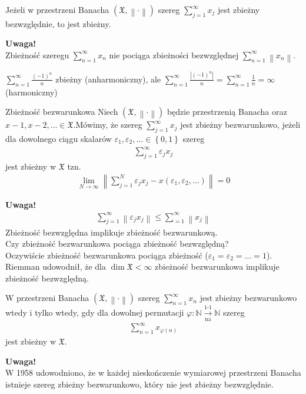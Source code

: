 \begin{twr}
Jeżeli w przestrzeni Banacha $ \left(\mathfrak X,\left\|\cdot \right\|\right) $ szereg $ \sum_{j=1}^{\infty }x_j  $ jest zbieżny bezwzględnie, to jest zbieżny.
\end{twr}
\textbf{Uwaga!}\\
Zbieżność szeregu $ \sum_{n=1}^{\infty }x_n $  nie pociąga zbieżności bezwzględnej $ \sum_{n=1}^{\infty }\left\|x_n\right\| $.
\begin{prz}
$ \sum_{n=1}^{\infty }\frac{(-1)^n}{n} $ zbieżny (anharmoniczny), ale $ \sum_{n=1}^{\infty }\frac{\left|(-1)^n\right|}{n}=\sum_{n=1}^{\infty }\frac{1}{n}=\infty  $ (harmoniczny)
\end{prz}
\begin{defi}{Zbieżność bezwarunkowa}
Niech $ \left(\mathfrak X,\left\|\cdot \right\|\right) $ będzie przestrzenią Banacha oraz $ x-1,x-2,\dots \in\mathfrak X $.Mówimy, że szereg $ \sum_{j=1}^{\infty }x_j $ jest zbieżny bezwarunkowo, jeżeli dla dowolnego ciągu skalarów $ \varepsilon_1,\varepsilon_2,\dots\in\left\{0,1 \right\} $ szereg
\begin{gather*}
\sum_{j=1}^{\infty }\varepsilon_jx_j
\end{gather*}
jest zbieżny w $ \mathfrak X $ tzn.
\begin{gather*}
\lim\limits_{N\to\infty}\left\|\sum_{j=1}^{N}\varepsilon_jx_j-x(\varepsilon_1,\varepsilon_2,\dots )\right\| =0
\end{gather*}
\end{defi}
\textbf{Uwaga!}\\
\begin{gather*}
\sum_{j=1}^{\infty }\left\|\varepsilon_jx_j \right\| \le\sum_{=1}^{\infty }\left\|x_j\right\|
\end{gather*}
Zbieżność bezwzględna implikuje zbieżność bezwarunkową.\\
Czy zbieżność bezwarunkowa pociąga zbieżność bezwzględną?\\
Oczywiście zbieżność bezwarunkowa pociąga zbieżność ($ \varepsilon_1=\varepsilon_2=\dots=1 $). Riemman udowodnił, że dla $ \dim\mathfrak X<\infty  $ zbieżność bezwarunkowa implikuje zbieżność bezwzględną.
\begin{twr}
W przestrzeni Banacha $ \left(\mathfrak X, \left\|\cdot \right\|\right) $ szereg $ \sum_{n=1}^{\infty }x_n $ jest zbieżny bezwarunkowo wtedy i tylko wtedy, gdy dla dowolnej permutacji $ \varphi:\mathbb N \xrightarrow[\text{na}]{\text{1-1}}\mathbb N  $ szereg \begin{gather*}
\sum_{n=1}^{\infty }x_{\varphi(n)}
\end{gather*}
jest zbieżny w $ \mathfrak X $.
\end{twr}
\textbf{Uwaga!}\\
W 1958 udowodniono, że w każdej nieskończenie wymiarowej przestrzeni Banacha istnieje szereg  zbieżny bezwarunkowo, który nie jest zbieżny bezwzględnie.

